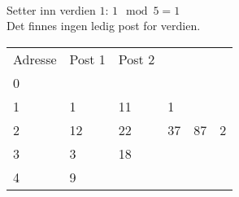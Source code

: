 \documentclass[a4paper, 12pt] {article}
\begin{document}
~\\
Setter inn verdien $1$: $1 \mod 5 = 1$\\
Det finnes ingen ledig post for verdien.\\
\begin{tabular}{|l|l|l|lll}
    \hline
    Adresse & Post 1 & Post 2	& ~ \\
    0       & ~      & ~      \\
    1       & 1      & 11   &	1      \\
    2       & 12     & 22	& 37	&   87	&   2\\
    3       & 3      & 18     \\
    4       & 9      & ~      \\ \hline
\end{tabular}
\end{document}
